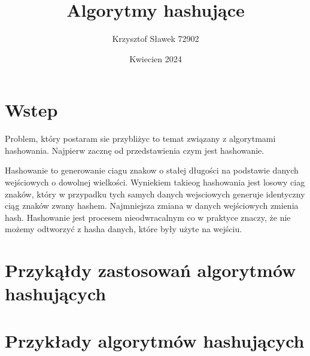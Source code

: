 \documentclass{article}
\title{Algorytmy hashujące}
\author{Krzysztof Sławek 72902}
\date{Kwiecien 2024}
\begin{document}
\maketitle

\section{Wstep}
Problem, który postaram sie przybliżyc to temat związany z algorytmami hashowania.
Najpierw zacznę od przedstawienia czym jest hashowanie.

Hashowanie to generowanie ciagu znakow o stałej długości na podstawie danych wejściowych o dowolnej wielkości. Wyniekiem takieog hashowania jest losowy ciag znaków, który w przypadku tych samych danych wejsciowych generuje identyczny ciąg znaków zwany hashem. Najmniejsza zmiana w danych wejściowych zmienia hash. 
Hashowanie jest procesem nieodwracalnym co w praktyce znaczy, że nie możemy odtworzyć z hasha danych, które były użyte na wejściu.

\section{Przykąłdy zastosowań algorytmów hashujących}


\section{Przykłady algorytmów hashujących}
\end{document}
